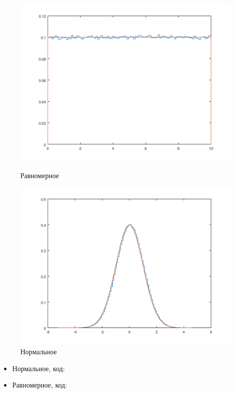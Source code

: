 \documentclass{article}
\begin{document}
\begin{figure}[h]
	\centering
	\begin{minipage}{0.45\textwidth}
		\centering
		\includegraphics[width=\textwidth]{lab4_unif_plot.png}
		\caption{Равномерное}
	\end{minipage}\hfill
	\begin{minipage}{0.45\textwidth}
		\centering
		\includegraphics[width=\textwidth]{lab4_norm_plot.png}
		\caption{Нормальное}
	\end{minipage}
\end{figure}

\begin{itemize}
	\item Нормальное, код:
	
	
	\item Равномерное, код:
	
	
\end{itemize}
\end{document}
